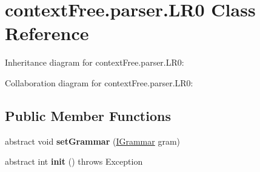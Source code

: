 \hypertarget{classcontext_free_1_1parser_1_1_l_r0}{\section{context\-Free.\-parser.\-L\-R0 Class Reference}
\label{classcontext_free_1_1parser_1_1_l_r0}
}


Inheritance diagram for context\-Free.\-parser.\-L\-R0\-:


Collaboration diagram for context\-Free.\-parser.\-L\-R0\-:
\subsection*{Public Member Functions}
\begin{DoxyCompactItemize}
\item 
\hypertarget{classcontext_free_1_1parser_1_1_l_r0_ab87079bb387c26bad40d3678e80eefc9}{abstract void {\bfseries set\-Grammar} (\hyperlink{interfacecontext_free_1_1grammar_1_1_i_grammar}{I\-Grammar} gram)}\label{classcontext_free_1_1parser_1_1_l_r0_ab87079bb387c26bad40d3678e80eefc9}

\item 
\hypertarget{classcontext_free_1_1parser_1_1_l_r0_a1936c0d9c7c80de80a5b3913f8f710b7}{abstract int {\bfseries init} ()  throws Exception}\label{classcontext_free_1_1parser_1_1_l_r0_a1936c0d9c7c80de80a5b3913f8f710b7}


\end{DoxyCompactItemize}
